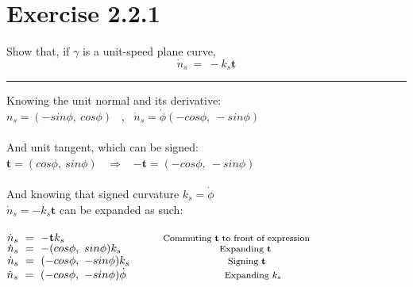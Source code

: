 \documentclass[12pt]{article}
\begin{document}
\maketitle

\section*{Exercise 2.2.1}
Show that, if $\gamma$ is a unit-speed plane curve,
$$ \dot n_s \ = \ -k_s \textbf{t}$$ 

\vspace{1cm}
\hrule
\vspace{1cm}
Knowing the unit normal and its derivative: \\
$ n_s = (-sin\phi, \ cos\phi)$ \ , \ $\dot n_s = \dot \phi (-cos\phi, \ -sin\phi)$ \\
\\
And unit tangent, which can be signed:\\
$\textbf{t} = (cos\phi, \ sin\phi) $ \ $\Rightarrow$ \ $-\textbf{t} = (-cos\phi, \ -sin\phi) $
\\
\\

And knowing that signed curvature $k_s = \dot \phi $ \\

$  \dot n_s = -k_s\textbf{t} $ can be expanded as such: \\
\\
$  \dot n_s \ = \ -\textbf{t}k_s \textrm{\hspace{3cm} \footnotesize Commuting \textbf{t} to front of expression }$ \\
$  \dot n_s \ = \ -(cos\phi, \ sin\phi)k_s\textrm{\hspace{3cm} \footnotesize Expanding \textbf{t} }$ \\
$  \dot n_s \ = \ (-cos\phi, \ -sin\phi)k_s\textrm{\hspace{3cm} \footnotesize Signing \textbf{t} }$ \\
$  \dot n_s \ = \ (-cos\phi, \ -sin\phi)\dot\phi\textrm{\hspace{3cm} \footnotesize Expanding $k_s$ }$ \\
\end{document}
